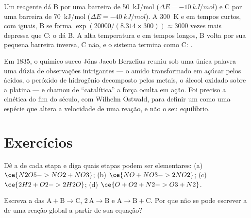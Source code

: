 \begin{example}\label{ex:b1:elementary-steps:control}
Um reagente dá B por uma barreira de \qty{50}{kJ/mol} ($\Delta E =
\qty{-10}{kJ/mol}$) e C por uma barreira de \qty{70}{kJ/mol} ($\Delta E =
\qty{-40}{kJ/mol}$). A \qty{300}{K} e em tempos curtos, com  iguais, B se forma $\exp(20000/(8.314 \times 300)) \approx
3000$ vezes mais depressa que C: o  dá B. A alta
temperatura e em tempos longos, B volta por sua pequena barreira inversa,
C não, e o sistema termina como C: .
\end{example}

\begin{history}[A catálise, 1835]
Em 1835, o químico sueco Jöns Jacob Berzelius reuniu sob uma única
palavra uma dúzia de observações intrigantes --- o amido transformado em
açúcar pelos ácidos, o peróxido de hidrogênio decomposto pelos metais, o
álcool oxidado sobre a platina --- e chamou de ``catalítica'' a força
oculta em ação. Foi preciso a cinética do fim do século, com Wilhelm
Ostwald, para definir um  como uma espécie que altera a
velocidade de uma reação, e não o seu equilíbrio.
\end{history}

\section{Exercícios}

\begin{exercise}[$\star$]\label{exo:b1:elementary-steps:1}
Dê a  de cada etapa e diga quais etapas podem ser elementares:
(a) $\ce{N2O5 -> NO2 + NO3}$; (b) $\ce{NO + NO3 -> 2NO2}$;
(c) $\ce{2H2 + O2 -> 2H2O}$; (d) $\ce{O + O2 + N2 -> O3 + N2}$.
\end{exercise}

\begin{exercise}[$\star$]\label{exo:b1:elementary-steps:2}
Escreva a  das  $\mathrm{A} + \mathrm{B} \to
\mathrm{C}$, $2\,\mathrm{A} \to \mathrm{B}$ e $\mathrm{A} \to \mathrm{B} +
\mathrm{C}$. Por que não se pode escrever a  de uma
reação global a partir de sua equação?
\end{exercise}

